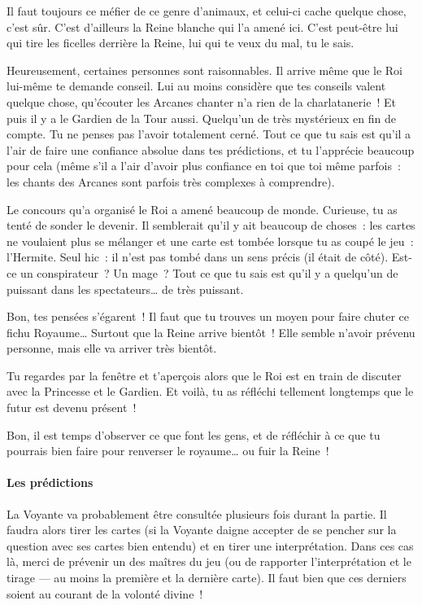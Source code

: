 {{Il faut toujours ce méfier de ce genre d’animaux, et celui-ci cache quelque chose, c’est sûr.
C’est d’ailleurs la Reine blanche qui l’a amené ici.
C’est peut-être lui qui tire les ficelles derrière la Reine, lui qui te veux du mal, tu le sais.

Heureusement, certaines personnes sont raisonnables.
Il arrive même que le Roi lui-même te demande conseil.
Lui au moins considère que tes conseils valent quelque chose, qu’écouter les Arcanes chanter n’a rien de la charlatanerie~!
Et puis il y a le Gardien de la Tour aussi.
Quelqu’un de très mystérieux en fin de compte.
Tu ne penses pas l’avoir totalement cerné.
Tout ce que tu sais est qu’il a l’air de faire une confiance absolue dans tes prédictions, et tu l’apprécie beaucoup pour cela (même s’il a l’air d’avoir plus confiance en toi que toi même parfois~:  les chants des Arcanes sont parfois très complexes à comprendre).

Le concours qu’a organisé le Roi a amené beaucoup de monde.
Curieuse, tu as tenté de sonder le devenir.
Il semblerait qu’il y ait beaucoup de choses~:  les cartes ne voulaient plus se mélanger et une carte est tombée lorsque tu as coupé le jeu~:  l’Hermite.
Seul hic~:  il n’est pas tombé dans un sens précis (il était de côté).
Est-ce un conspirateur~?  Un mage~?
Tout ce que tu sais est qu’il y a quelqu’un de puissant dans les spectateurs… de très puissant.

Bon, tes pensées s’égarent~!
Il faut que tu trouves un moyen pour faire chuter ce fichu Royaume…  Surtout que la Reine arrive bientôt~!
Elle semble n’avoir prévenu personne, mais elle va arriver très bientôt.

Tu regardes par la fenêtre et t’aperçois alors que le Roi est en train de discuter avec la Princesse et le Gardien.
Et voilà, tu as réfléchi tellement longtemps que le futur est devenu présent~!

Bon, il est temps d’observer ce que font les gens, et de réfléchir à ce que tu pourrais bien faire pour renverser le royaume… ou fuir la Reine~!
}

\paragraph{Les prédictions}{
La Voyante va probablement être consultée plusieurs fois durant la partie.
Il faudra alors tirer les cartes (si la Voyante daigne accepter de se pencher sur la question avec ses cartes bien entendu) et en tirer une interprétation.
Dans ces cas là, merci de prévenir un des maîtres du jeu (ou de rapporter l’interprétation et le tirage — au moins la première et la dernière carte).
Il faut bien que ces derniers soient au courant de la volonté divine~!

}}
